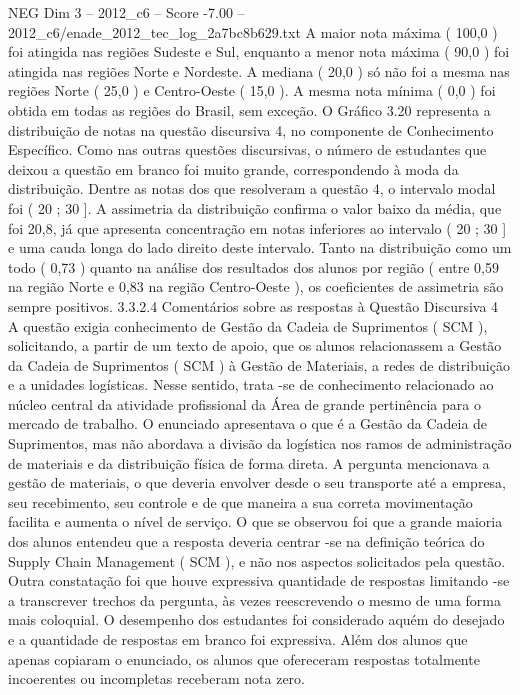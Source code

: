 \begin{textsample}{NEG Dim 3 – 2012\_c6 – Score -7.00 – 2012\_c6/enade\_2012\_tec\_log\_2a7bc8b629.txt}
A maior nota máxima ( 100,0 ) foi atingida nas regiões Sudeste e Sul, enquanto a menor nota máxima ( 90,0 ) foi atingida nas regiões Norte e Nordeste.
A mediana ( 20,0 ) só não foi a mesma nas regiões Norte ( 25,0 ) e Centro-Oeste ( 15,0 ).
A mesma nota mínima ( 0,0 ) foi obtida em todas as regiões do Brasil, sem exceção.
O Gráfico 3.20 representa a distribuição de notas na questão discursiva 4, no componente de Conhecimento Específico.
Como nas outras questões discursivas, o número de estudantes que deixou a questão em branco foi muito grande, correspondendo à moda da distribuição.
Dentre as notas dos que resolveram a questão 4, o intervalo modal foi ( 20 ; 30 ].
A assimetria da distribuição confirma o valor baixo da média, que foi 20,8, já que apresenta concentração em notas inferiores ao intervalo ( 20 ; 30 ] e uma cauda longa do lado direito deste intervalo.
Tanto na distribuição como um todo ( 0,73 ) quanto na análise dos resultados dos alunos por região ( entre 0,59 na região Norte e 0,83 na região Centro-Oeste ), os coeficientes de assimetria são sempre positivos. 3.3.2.4 Comentários sobre as respostas à Questão Discursiva 4 A questão exigia conhecimento de Gestão da Cadeia de Suprimentos ( SCM ), solicitando, a partir de um texto de apoio, que os alunos relacionassem a Gestão da Cadeia de Suprimentos ( SCM ) à Gestão de Materiais, a redes de distribuição e a unidades logísticas.
Nesse sentido, trata -se de conhecimento relacionado ao núcleo central da atividade profissional da Área de grande pertinência para o mercado de trabalho.
O enunciado apresentava o que é a Gestão da Cadeia de Suprimentos, mas não abordava a divisão da logística nos ramos de administração de materiais e da distribuição física de forma direta.
A pergunta mencionava a gestão de materiais, o que deveria envolver desde o seu transporte até a empresa, seu recebimento, seu controle e de que maneira a sua correta movimentação facilita e aumenta o nível de serviço.
O que se observou foi que a grande maioria dos alunos entendeu que a resposta deveria centrar -se na definição teórica do Supply Chain Management ( SCM ), e não nos aspectos solicitados pela questão.
Outra constatação foi que houve expressiva quantidade de respostas limitando -se a transcrever trechos da pergunta, às vezes reescrevendo o mesmo de uma forma mais coloquial.
O desempenho dos estudantes foi considerado aquém do desejado e a quantidade de respostas em branco foi expressiva.
Além dos alunos que apenas copiaram o enunciado, os alunos que ofereceram respostas totalmente incoerentes ou incompletas receberam nota zero.

\end{textsample}
